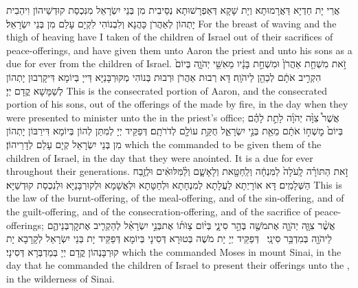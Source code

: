 {אֲרֵי יָת חַדְיָא דַּאֲרָמוּתָא וְיָת שָׁקָא דְּאַפְרָשׁוּתָא נְסֵיבִית מִן בְּנֵי יִשְׂרָאֵל מִנִּכְסַת קוּדְשֵׁיהוֹן וִיהַבִית יָתְהוֹן לְאַהֲרֹן כָּהֲנָא וְלִבְנוֹהִי לִקְיָם עָלַם מִן בְּנֵי יִשְׂרָאֵל׃}
{For the breast of waving and the thigh of heaving have I taken of the children of Israel out of their sacrifices of peace-offerings, and have given them unto Aaron the priest and unto his sons as a due for ever from the children of Israel.}{}
{זֹ֣את מִשְׁחַ֤ת אַהֲרֹן֙ וּמִשְׁחַ֣ת בָּנָ֔יו מֵאִשֵּׁ֖י יְהֹוָ֑ה בְּיוֹם֙ הִקְרִ֣יב אֹתָ֔ם לְכַהֵ֖ן לַיהֹוָֽה׃}
{דָּא רְבוּת אַהֲרֹן וּרְבוּת בְּנוֹהִי מְקּוּרְבָּנַיָּא דַּייָ בְּיוֹמָא דִּיקָרְבוּן יָתְהוֹן לְשַׁמָּשָׁא קֳדָם יְיָ׃}
{This is the consecrated portion of Aaron, and the consecrated portion of his sons, out of the offerings of the \lord\space made by fire, in the day when they were presented to minister unto the \lord\space in the priest’s office;}{}
{אֲשֶׁר֩ צִוָּ֨ה יְהֹוָ֜ה לָתֵ֣ת לָהֶ֗ם בְּיוֹם֙ מׇשְׁח֣וֹ אֹתָ֔ם מֵאֵ֖ת בְּנֵ֣י יִשְׂרָאֵ֑ל חֻקַּ֥ת עוֹלָ֖ם לְדֹרֹתָֽם׃}
{דְּפַקֵּיד יְיָ לְמִתַּן לְהוֹן בְּיוֹמָא דִּירַבּוֹן יָתְהוֹן מִן בְּנֵי יִשְׂרָאֵל קְיָם עָלַם לְדָרֵיהוֹן׃}
{which the \lord\space commanded to be given them of the children of Israel, in the day that they were anointed. It is a due for ever throughout their generations.}{}
{זֹ֣את הַתּוֹרָ֗ה לָֽעֹלָה֙ לַמִּנְחָ֔ה וְלַֽחַטָּ֖את וְלָאָשָׁ֑ם וְלַ֨מִּלּוּאִ֔ים וּלְזֶ֖בַח הַשְּׁלָמִֽים׃}
{דָּא אוֹרָיְתָא לַעֲלָתָא לְמִנְחָתָא וּלְחַטָּתָא וּלְאֲשָׁמָא וּלְקוּרְבָּנַיָּא וּלְנִכְסַת קוּדְשַׁיָּא׃}
{This is the law of the burnt-offering, of the meal-offering, and of the sin-offering, and of the guilt-offering, and of the consecration-offering, and of the sacrifice of peace-offerings;}{}
{אֲשֶׁ֨ר צִוָּ֧ה יְהֹוָ֛ה אֶת\maqqaf מֹשֶׁ֖ה בְּהַ֣ר סִינָ֑י בְּי֨וֹם צַוֺּת֜וֹ אֶת\maqqaf בְּנֵ֣י יִשְׂרָאֵ֗ל לְהַקְרִ֧יב אֶת\maqqaf קׇרְבְּנֵיהֶ֛ם לַיהֹוָ֖ה בְּמִדְבַּ֥ר סִינָֽי׃ \petucha }
{דְּפַקֵּיד יְיָ יָת מֹשֶׁה בְּטוּרָא דְּסִינָי בְּיוֹמָא דְּפַקֵּיד יָת בְּנֵי יִשְׂרָאֵל לְקָרָבָא יָת קוּרְבָּנְהוֹן קֳדָם יְיָ בְּמַדְבְּרָא דְּסִינָי׃}
{which the \lord\space commanded Moses in mount Sinai, in the day that he commanded the children of Israel to present their offerings unto the \lord, in the wilderness of Sinai.}{}

